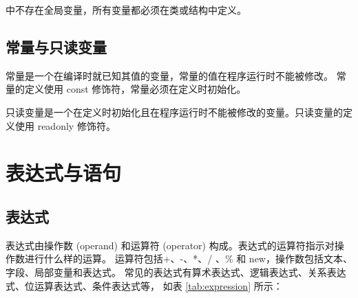 \cs 中不存在全局变量，所有变量都必须在类或结构中定义。

\subsection{常量与只读变量}

常量是一个在编译时就已知其值的变量，常量的值在程序运行时不能被修改。
常量的定义使用 const 修饰符，常量必须在定义时初始化。

只读变量是一个在定义时初始化且在程序运行时不能被修改的变量。只读变量的定义使用 readonly 修饰符。

\section{表达式与语句}

\subsection{表达式}
表达式由操作数 (operand) 和运算符 (operator) 构成。表达式的运算符指示对操作数进行什么样的运算。
运算符包括+、-、*、/ 、\% 和 new，操作数包括文本、字段、局部变量和表达式。
常见的表达式有算术表达式、逻辑表达式、关系表达式、位运算表达式、条件表达式等，
如表 \ref{tab:expression} 所示：


